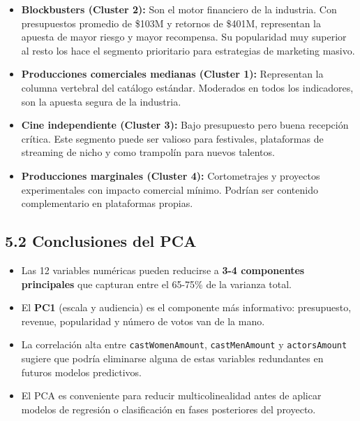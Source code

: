 \documentclass[
]{article}
\providecommand{\tightlist}{%
  \setlength{\itemsep}{0pt}\setlength{\parskip}{0pt}}
\begin{document}
\begin{itemize}
\tightlist
\item
  \textbf{Blockbusters (Cluster 2):} Son el motor financiero de la
  industria. Con presupuestos promedio de \$103M y retornos de \$401M,
  representan la apuesta de mayor riesgo y mayor recompensa. Su
  popularidad muy superior al resto los hace el segmento prioritario
  para estrategias de marketing masivo.\\
\item
  \textbf{Producciones comerciales medianas (Cluster 1):} Representan la
  columna vertebral del catálogo estándar. Moderados en todos los
  indicadores, son la apuesta segura de la industria.\\
\item
  \textbf{Cine independiente (Cluster 3):} Bajo presupuesto pero buena
  recepción crítica. Este segmento puede ser valioso para festivales,
  plataformas de streaming de nicho y como trampolín para nuevos
  talentos.\\
\item
  \textbf{Producciones marginales (Cluster 4):} Cortometrajes y
  proyectos experimentales con impacto comercial mínimo. Podrían ser
  contenido complementario en plataformas propias.
\end{itemize}

\subsection{5.2 Conclusiones del PCA}\label{conclusiones-del-pca-1}

\begin{itemize}
\tightlist
\item
  Las 12 variables numéricas pueden reducirse a \textbf{3-4 componentes
  principales} que capturan entre el 65-75\% de la varianza total.\\
\item
  El \textbf{PC1} (escala y audiencia) es el componente más informativo:
  presupuesto, revenue, popularidad y número de votos van de la mano.\\
\item
  La correlación alta entre \texttt{castWomenAmount},
  \texttt{castMenAmount} y \texttt{actorsAmount} sugiere que podría
  eliminarse alguna de estas variables redundantes en futuros modelos
  predictivos.\\
\item
  El PCA es conveniente para reducir multicolinealidad antes de aplicar
  modelos de regresión o clasificación en fases posteriores del
  proyecto.
\end{itemize}
\end{document}

